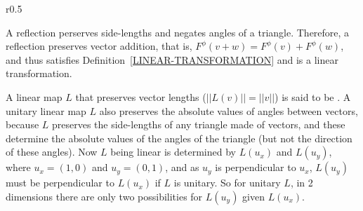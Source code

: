 \documentclass[12pt]{article}
\begin{document}
\bigskip

\begin{minipage}{\textwidth}\raggedright
\begin{wrapfigure}[7]{r}{0.5\textwidth}
\end{wrapfigure}
A reflection perserves side-lengths and negates angles of a triangle.
Therefore, a reflection preserves vector addition, that is,
$F^\phi(v+w)=F^\phi(v)+F^\phi(w)$, and thus
satisfies Definition~\ref{LINEAR-TRANSFORMATION}
and is a linear transformation.
\end{minipage}

\vspace{0.5in}

A linear map $L$ that preserves vector lengths ($||L(v)||=||v||$)
is said to be .
A unitary linear map $L$
also preserves the absolute values of angles between vectors,
because $L$ preserves the side-lengths of any triangle made of
vectors, and these determine the absolute values of the angles of
the triangle (but not the direction of these angles).  Now
$L$ being linear is determined by $L(u_x)$ and $L(u_y)$, where
$u_x=(1,0)$ and $u_y=(0,1)$, and as $u_y$ is perpendicular to
$u_x$, $L(u_y)$ must be perpendicular to $L(u_x)$ if $L$ is unitary.
So for unitary $L$, in 2 dimensions there are only two possibilities
for $L(u_y)$ given $L(u_x)$.
\end{document}
